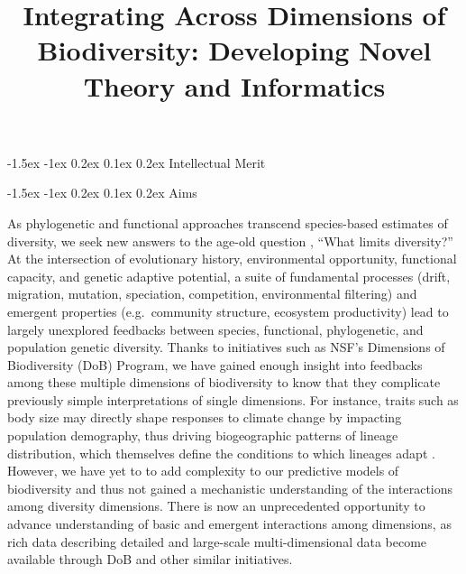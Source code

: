 \documentclass[11pt]{article}
\title{Integrating Across Dimensions of Biodiversity: Developing Novel Theory and Informatics}
\author{}
\date{}
\makeatletter
\renewcommand\section{\@startsection{section}{1}{\z@}%
                                  {-1.5ex \@plus -1ex \@minus 0.2ex}%
                                  {0.1ex \@plus 0.2ex}%
                                  {\normalfont\Large\bfseries}}
\renewcommand\subsection{\@startsection{subsection}{1}{\z@}%
                                  {-1.5ex \@plus -1ex \@minus 0.2ex}%
                                  {0.1ex \@plus 0.2ex}%
                                  {\normalfont\large\bfseries}}
\makeatother
\begin{document}
\maketitle
\vspace{-6em}

\section{Intellectual Merit}\label{intellectual-merit}

\subsection{Aims}\label{aims}

As phylogenetic and functional approaches transcend species-based
estimates of diversity, we seek new answers to the age-old question
\cite{Hutchinson1959-ob}, ``What limits diversity?'' At the
intersection of evolutionary history, environmental opportunity,
functional capacity, and genetic adaptive potential, a suite of
fundamental processes (drift, migration, mutation, speciation,
competition, environmental filtering) and emergent properties
(e.g.~community structure, ecosystem productivity) lead to largely
unexplored feedbacks between species, functional, phylogenetic, and
population genetic diversity. Thanks to initiatives such as NSF's
Dimensions of Biodiversity (DoB) Program, we have gained enough
insight into feedbacks among these multiple dimensions of biodiversity
to know that they complicate previously simple interpretations of
single dimensions. For instance, traits such as body size may directly
shape responses to climate change by impacting population demography,
thus driving biogeographic patterns of lineage distribution, which
themselves define the conditions to which lineages adapt
\cite{Prates2016-gr,Carnaval2014-je}. However, we have yet to to add
complexity to our predictive models of biodiversity and thus not
gained a mechanistic understanding of the interactions among diversity
dimensions. There is now an unprecedented opportunity to advance
understanding of basic and emergent interactions among dimensions, as
rich data describing detailed and large-scale multi-dimensional data
become available through DoB and other similar initiatives.
\end{document}
